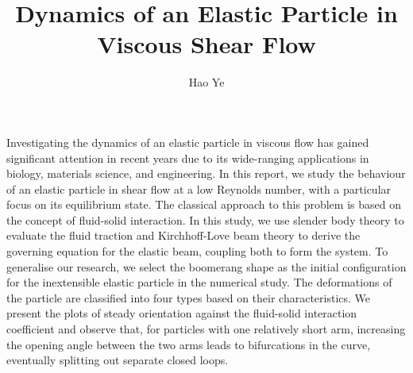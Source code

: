 \documentclass[12pt,MSc,twoside]{muthesis_2020}
\begin{document}
\title{Dynamics of an Elastic Particle in Viscous Shear Flow}
\author{Hao Ye}
\def\wordcount{11172}

\tablespagefalse

\figurespagefalse


\beforeabstract

Investigating the dynamics of an elastic particle in viscous flow has gained significant attention in recent years due to its wide-ranging applications in biology, materials science, and engineering. In this report, we study the behaviour of an elastic particle in shear flow at a low Reynolds number, with a particular focus on its equilibrium state. The classical approach to this problem is based on the concept of fluid-solid interaction. In this study, we use slender body theory to evaluate the fluid traction and Kirchhoff-Love beam theory to derive the governing equation for the elastic beam, coupling both to form the system. To generalise our research, we select the boomerang shape as the initial configuration for the inextensible elastic particle in the numerical study. The deformations of the particle are classified into four types based on their characteristics. We present the plots of steady orientation against the fluid-solid interaction coefficient and observe that, for particles with one relatively short arm, increasing the opening angle between the two arms leads to bifurcations in the curve, eventually splitting out separate closed loops.








\afterpreface


\end{document}
